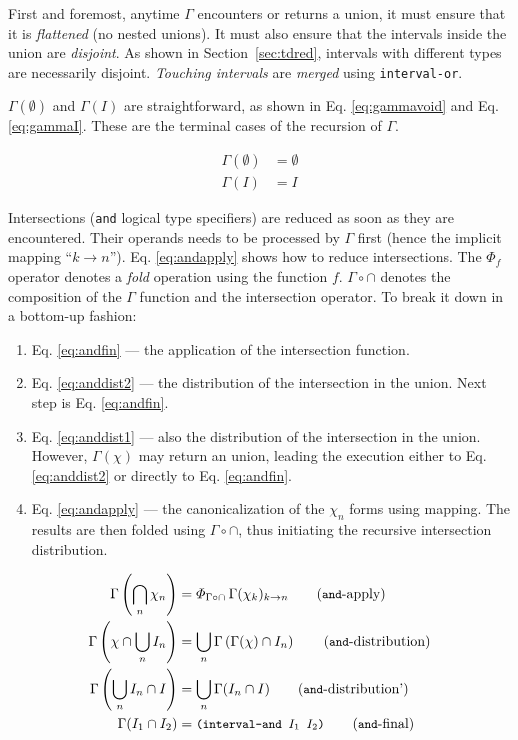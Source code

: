 \documentclass[format=sigconf]{acmart}
\newcommand\code[2][\small]{\sloppy\texttt{#1#2}}
\newcommand\mcode[2][\small]{\text{\code[#1]{#2}}}
\theoremstyle{definition}
\begin{document}
First and foremost, anytime $\Gamma$ encounters or returns a union, it must
ensure that it is \emph{flattened} (no nested unions). It must also ensure that
the intervals inside the union are \emph{disjoint}. As shown in
Section~\ref{sec:tdred}, intervals with different types are necessarily
disjoint. \emph{Touching intervals} \cite{baker1992} are \emph{merged} using
\code{interval-or}.

$\Gamma(\emptyset)$ and $\Gamma(I)$ are straightforward, as shown in Eq.
\ref{eq:gammavoid} and Eq. \ref{eq:gammaI}. These are the terminal cases of the
recursion of $\Gamma$.

\begin{align}
  \Gamma(\emptyset) &= \emptyset \label{eq:gammavoid}\tag{end-$\emptyset$}\\
  \Gamma(I) &= I \label{eq:gammaI}\tag{end-$I$}
\end{align}

Intersections (\code{and} logical type specifiers) are reduced as soon as they
are encountered. Their operands needs to be processed by $\Gamma$ first (hence
the implicit mapping ``$k \rightarrow n$''). Eq. \ref{eq:andapply} shows how to
reduce intersections. The $\varPhi_f$ operator denotes a \emph{fold}
\cite{Hutton1999fold} operation using the function $f$. $\Gamma \circ \cap$
denotes the composition of the $\Gamma$ function and the intersection operator.
To break it down in a bottom-up fashion:
\begin{enumerate}
\item Eq. \ref{eq:andfin} --- the application of the intersection function.
\item Eq. \ref{eq:anddist2} --- the distribution of the intersection in the union.
  Next step is Eq. \ref{eq:andfin}.
\item Eq. \ref{eq:anddist1} --- also the distribution of the intersection in the
  union. However, $\Gamma(\chi)$ may return an union, leading the execution
  either to Eq. \ref{eq:anddist2} or directly to Eq. \ref{eq:andfin}.
\item Eq. \ref{eq:andapply} --- the canonicalization of the $\chi_n$ forms using
  mapping. The results are then folded using $\Gamma \circ \cap$, thus
  initiating the recursive intersection distribution.
\end{enumerate}

\begin{align}
  \Gamma\left(\bigcap_n \chi_n\right) &= \varPhi_{\Gamma \circ \cap}\, \Gamma(\chi_k)_{k \rightarrow n} \label{eq:andapply}\tag{\code{and}-apply}\\
  \Gamma\left(\chi \cap \bigcup_n I_n\right) &= \bigcup_n \Gamma\left(\Gamma(\chi) \cap I_n\right) \label{eq:anddist1}\tag{\code{and}-distribution}\\
  \Gamma\left(\bigcup_n I_n \cap I\right) &= \bigcup_n \Gamma(I_n \cap I) \label{eq:anddist2}\tag{\code{and}-distribution'}\\
  \Gamma(I_1 \cap I_2) &= \mcode{(interval-and $I_1$ $I_2$)} \label{eq:andfin}\tag{\code{and}-final}
\end{align}
\end{document}
